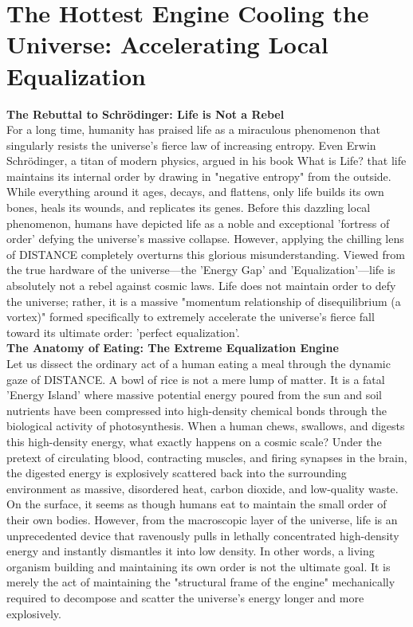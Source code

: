 

\section{The Hottest Engine Cooling the Universe: Accelerating Local Equalization}
\textbf{The Rebuttal to Schrödinger: Life is Not a Rebel} \\
For a long time, humanity has praised life as a miraculous phenomenon that singularly resists the universe's fierce law of increasing entropy. Even Erwin Schrödinger, a titan of modern physics, argued in his book What is Life? that life maintains its internal order by drawing in "negative entropy" from the outside. While everything around it ages, decays, and flattens, only life builds its own bones, heals its wounds, and replicates its genes. Before this dazzling local phenomenon, humans have depicted life as a noble and exceptional 'fortress of order' defying the universe's massive collapse.
However, applying the chilling lens of DISTANCE completely overturns this glorious misunderstanding. Viewed from the true hardware of the universe—the 'Energy Gap' and 'Equalization'—life is absolutely not a rebel against cosmic laws. Life does not maintain order to defy the universe; rather, it is a massive "momentum relationship of disequilibrium (a vortex)" formed specifically to extremely accelerate the universe's fierce fall toward its ultimate order: 'perfect equalization'. \\
\textbf{The Anatomy of Eating: The Extreme Equalization Engine} \\
Let us dissect the ordinary act of a human eating a meal through the dynamic gaze of DISTANCE. A bowl of rice is not a mere lump of matter. It is a fatal 'Energy Island' where massive potential energy poured from the sun and soil nutrients have been compressed into high-density chemical bonds through the biological activity of photosynthesis.
When a human chews, swallows, and digests this high-density energy, what exactly happens on a cosmic scale? Under the pretext of circulating blood, contracting muscles, and firing synapses in the brain, the digested energy is explosively scattered back into the surrounding environment as massive, disordered heat, carbon dioxide, and low-quality waste.
On the surface, it seems as though humans eat to maintain the small order of their own bodies. However, from the macroscopic layer of the universe, life is an unprecedented device that ravenously pulls in lethally concentrated high-density energy and instantly dismantles it into low density. In other words, a living organism building and maintaining its own order is not the ultimate goal. It is merely the act of maintaining the "structural frame of the engine" mechanically required to decompose and scatter the universe's energy longer and more explosively. \\
